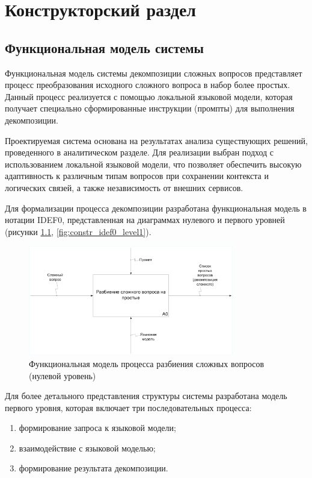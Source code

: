 \chapter{Конструкторский раздел}

\section{Функциональная модель системы}

Функциональная модель системы декомпозиции сложных вопросов представляет процесс преобразования исходного сложного вопроса в набор более простых. Данный процесс реализуется с помощью локальной языковой модели, которая получает специально сформированные инструкции (промпты) для выполнения декомпозиции.

Проектируемая система основана на результатах анализа существующих решений, проведенного в аналитическом разделе. Для реализации выбран подход с использованием локальной языковой модели, что позволяет обеспечить высокую адаптивность к различным типам вопросов при сохранении контекста и логических связей, а также независимость от внешних сервисов.

Для формализации процесса декомпозиции разработана функциональная модель в нотации IDEF0, представленная на диаграммах нулевого и первого уровней (рисунки \ref{fig:constr_idef0_level0}, \ref{fig:constr_idef0_level1}).

\begin{figure}[h]
	\centering
	\includegraphics[width=0.8\textwidth]{images/idef0_level0.pdf}
	\caption{Функциональная модель процесса разбиения сложных вопросов (нулевой уровень)}
	\label{fig:constr_idef0_level0}
\end{figure}

\newpage

Для более детального представления структуры системы разработана модель первого уровня, которая включает три последовательных процесса:
\begin{enumerate}
	\item формирование запроса к языковой модели;
	\item взаимодействие с языковой моделью;
	\item формирование результата декомпозиции.
\end{enumerate}

